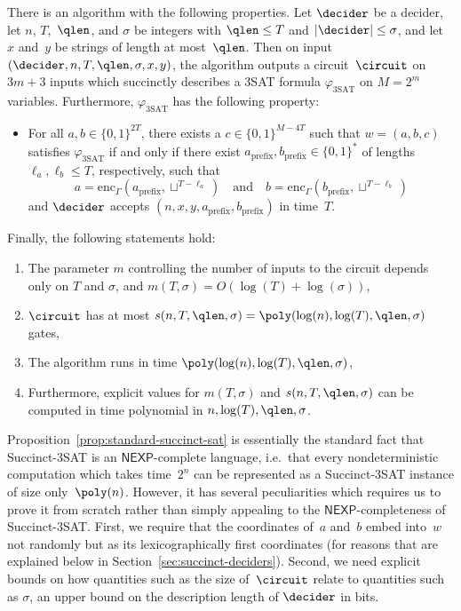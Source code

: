 \begin{proposition}
  \label{prop:standard-succinct-sat}
  There is an algorithm with the following properties.
  Let $\decider$ be a decider, let $n$, $T$,~$\qlen$, and $\sigma$ be integers
  with $\qlen \leq T$ and $|\decider| \leq \sigma$, and let~$x$ and~$y$ be
  strings of length at most~$\qlen$.
  Then on input $(\decider, n, T, \qlen, \sigma, x, y)$, the algorithm outputs
  a circuit~$\circuit$ on $3m + 3$ inputs which succinctly describes a 3SAT
  formula $\varphi_{\mathrm{3SAT}}$ on $M = 2^m$ variables.
  Furthermore, $\varphi_{\mathrm{3SAT}}$ has the following property:
  \begin{itemize}
  \item For all $a, b \in \{0, 1\}^{2T}$, there exists a $c \in \{0, 1\}^{M-4T}$
    such that $w = (a, b, c)$ satisfies $\varphi_{\mathrm{3SAT}}$ if and only if
    there exist $a_{\mathrm{prefix}}, b_{\mathrm{prefix}} \in \{0, 1\}^*$ of
    lengths~$\ell_a, \ell_b \leq T$, respectively, such that
    \begin{equation*}
      a = \mathrm{enc}_\Gamma(a_{\mathrm{prefix}}, \sqcup^{T - \ell_a})
      \quad
      \text{and}
      \quad
      b = \mathrm{enc}_\Gamma(b_{\mathrm{prefix}}, \sqcup^{T - \ell_b})
    \end{equation*}
    and $\decider$ accepts $(n, x, y, a_{\mathrm{prefix}}, b_{\mathrm{prefix}})$
    in time~$T$.
  \end{itemize}
  Finally, the following statements hold:
  \begin{enumerate}
  \item The parameter $m$ controlling the number of inputs to the circuit
    depends only on $T$ and $\sigma$, and $m(T,\sigma) = O(\log(T) +
    \log(\sigma))$,
  \item $\circuit$ has at most $s(n,T,\qlen,\sigma)=\poly(\log(n), \log(T),
    \qlen, \sigma)$ gates,
  \item The algorithm runs in time $\poly(\log(n), \log(T), \qlen,\sigma)$,
  \item Furthermore, explicit values for $m(T, \sigma)$ and
    $s(n, T, \qlen, \sigma)$ can be computed in time polynomial in
    $n,\log(T),\qlen,\sigma$.
  \end{enumerate}
\end{proposition}

Proposition~\ref{prop:standard-succinct-sat} is essentially the standard fact
that Succinct-3SAT is an $\mathsf{NEXP}$-complete language, i.e.\ that every
nondeterministic computation which takes time~$2^n$ can be represented as a
Succinct-3SAT instance of size only~$\poly(n)$.
However, it has several peculiarities which requires us to prove it from scratch
rather than simply appealing to the $\mathsf{NEXP}$-completeness of
Succinct-3SAT.
First, we require that the coordinates of~$a$ and~$b$ embed into~$w$ not
randomly but as its lexicographically first coordinates (for reasons that are
explained below in Section~\ref{sec:succinct-deciders}).
Second, we need explicit bounds on how quantities such as the size of~$\circuit$
relate to quantities such as $\sigma$, an upper bound on the description length
of $\decider$ in bits.


